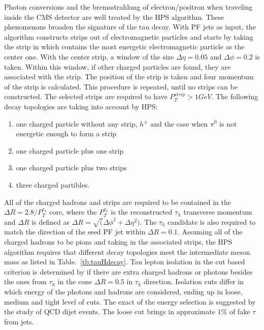 Photon conversions and the bremsstrahlung of electron/positron when traveling inside the CMS detector are well treated by the HPS algorithm. These phenomenons broaden the signature of the tau decay. With PF jets as input, the algorithm constructs strips out of electromagnetic particles and starts by taking the strip in which contains the most energetic electromagnetic particle as the center one. With the center strip, a window of the size $\Delta \eta=0.05$ and $\Delta \phi=0.2$ is taken. Within this window, if other charged particles are found, they are associated with the strip. The position of the strip is taken and four momentum of the strip is calculated. This procedure is repeated, until no strips can be constructed. The selected strips are required to have $P_{T}^{strip}>1GeV$. The following decay topologies are taking into account by HPS:
\begin{enumerate}[$\bullet$]
\item one charged particle without any strip, $h^{\pm}$ and the case when $\pi^{0}$ is not energetic enough to form a strip
\item one charged particle plus one strip
\item one charged particle plus two strips
\item three charged partibles. 
\end{enumerate} 

All of the charged hadrons and strips are required to be contained in the $\Delta R=2.8/P_{T}^{\tau_{h}}$ core, where the $P_{T}^{\tau_{h}}$ is the reconstructed $\tau_{h}$ transverse momentum and $\Delta R$ is defined as $\Delta R=\sqrt(\Delta \phi^{2}+\Delta \eta^{2})$. The $\tau_{h}$ candidate is also required to match the direction of the seed PF jet within $\Delta R=0.1$. Assuming all of the charged hadrons to be pions and taking in the associated strips, the HPS algorithm requires that different decay topologies meet the intermediate meson mass as listed in Table.~\ref{tb:tauHdecay}. Tau lepton isolation in the cut based criterion is determined by if there are extra charged hadrons or photons besides the ones from $\tau_{h}$ in the cone $\Delta R=0.5$ in $\tau_{h}$ direction. Isolation cuts differ in which energy of the photons and hadrons are considered, ending up in loose, medium and tight level of cuts. The exact of the energy selection is suggested by the study of QCD dijet events. The loose cut brings in approximate $1\%$ of fake $\tau$ from jets. 


